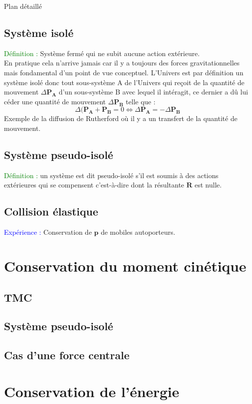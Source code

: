 \begin{reportBlock}{Plan détaillé}
\subsection{Système isolé}
\textcolor{green}{Définition :} Système fermé qui ne subit aucune action extérieure. \\
En pratique cela n'arrive jamais car il y a toujours des forces gravitationnelles mais fondamental d'un point de vue conceptuel. L'Univers est par définition un système isolé donc tout sous-système A de l'Univers qui reçoit de la quantité de mouvement $\Delta \mathbf{P_A}$ d'un sous-système B avec lequel il intéragit, ce dernier a dû lui céder une quantité de mouvement $\Delta \mathbf{P_B}$ telle que :
\begin{equation}
    \Delta(\mathbf{P_A}+\mathbf{P_B}= 0 \Leftrightarrow \Delta\mathbf{P_A} = -\Delta\mathbf{P_B}
\end{equation}
Exemple de la diffusion de Rutherford où il y a un transfert de la quantité de mouvement.
\subsection{Système pseudo-isolé}
\textcolor{green}{Définition :} un système est dit pseudo-isolé s'il est soumis à des actions extérieures qui se compensent c'est-à-dire dont la résultante $\mathbf{R}$ est nulle.
\subsection{Collision élastique}
\textcolor{blue}{Expérience : }Conservation de $\mathbf{p}$ de mobiles autoporteurs.

\section{Conservation du moment cinétique}

\subsection{TMC}
\subsection{Système pseudo-isolé}
\subsection{Cas d'une force centrale}

\section{Conservation de l'énergie}


\end{reportBlock}
